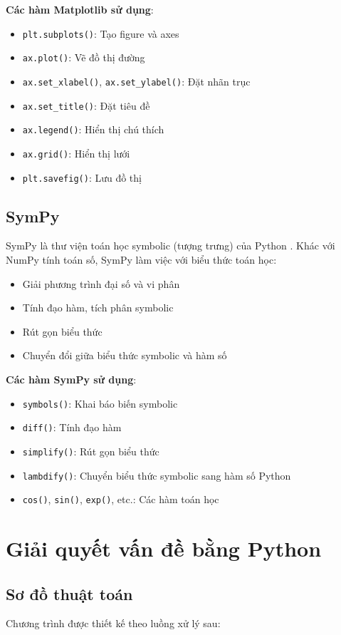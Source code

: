 \documentclass{report}
\begin{document}
\textbf{Các hàm Matplotlib sử dụng}:
\begin{itemize}
    \item \texttt{plt.subplots()}: Tạo figure và axes
    \item \texttt{ax.plot()}: Vẽ đồ thị đường
    \item \texttt{ax.set\_xlabel()}, \texttt{ax.set\_ylabel()}: Đặt nhãn trục
    \item \texttt{ax.set\_title()}: Đặt tiêu đề
    \item \texttt{ax.legend()}: Hiển thị chú thích
    \item \texttt{ax.grid()}: Hiển thị lưới
    \item \texttt{plt.savefig()}: Lưu đồ thị
\end{itemize}

\subsection{SymPy}
SymPy là thư viện toán học symbolic (tượng trưng) của Python \cite{sympy_docs}. Khác với NumPy tính toán số, SymPy làm việc với biểu thức toán học:
\begin{itemize}
    \item Giải phương trình đại số và vi phân
    \item Tính đạo hàm, tích phân symbolic
    \item Rút gọn biểu thức
    \item Chuyển đổi giữa biểu thức symbolic và hàm số
\end{itemize}

\textbf{Các hàm SymPy sử dụng}:
\begin{itemize}
    \item \texttt{symbols()}: Khai báo biến symbolic
    \item \texttt{diff()}: Tính đạo hàm
    \item \texttt{simplify()}: Rút gọn biểu thức
    \item \texttt{lambdify()}: Chuyển biểu thức symbolic sang hàm số Python
    \item \texttt{cos()}, \texttt{sin()}, \texttt{exp()}, etc.: Các hàm toán học
\end{itemize}

\section{Giải quyết vấn đề bằng Python}

\subsection{Sơ đồ thuật toán}
Chương trình được thiết kế theo luồng xử lý sau:
\end{document}
